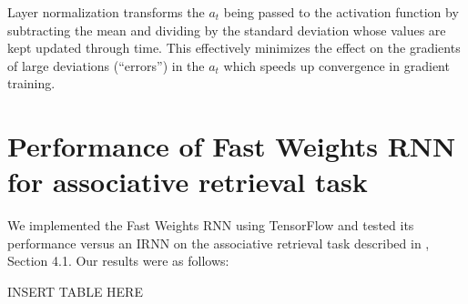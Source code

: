 Layer normalization \cite{DBLP:journals/corr/BaKH16} transforms the $a_t$ being passed to the activation function by subtracting the mean and dividing by the standard deviation whose values are kept updated through time. This effectively minimizes the effect on the gradients of large deviations (``errors'') in the $a_t$ which speeds up convergence in gradient training.

\section{Performance of Fast Weights RNN for associative retrieval task}

We implemented the Fast Weights RNN using TensorFlow \cite{abadi2016tensorflow} and tested its performance versus an IRNN on the associative retrieval task described in \citealt{DBLP:conf/nips/BaHMLI16}, Section 4.1. Our results were as follows:

INSERT TABLE HERE


